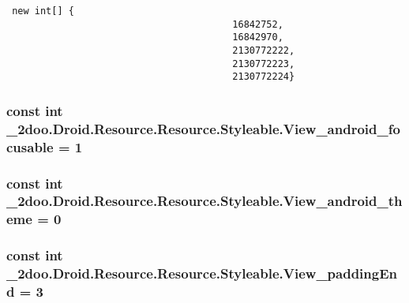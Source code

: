 \begin{Code}\begin{verbatim} new int[] {
                                        16842752,
                                        16842970,
                                        2130772222,
                                        2130772223,
                                        2130772224}
\end{verbatim}
\end{Code}
\hypertarget{class__2doo_1_1_droid_1_1_resource_1_1_styleable_40908f341b49b3e6357f0740e596a346}{
\subsubsection[{View\_\-android\_\-focusable}]{\setlength{\rightskip}{0pt plus 5cm}const int \_\-2doo.Droid.Resource.Resource.Styleable.View\_\-android\_\-focusable = 1}}
\label{class__2doo_1_1_droid_1_1_resource_1_1_styleable_40908f341b49b3e6357f0740e596a346}


\hypertarget{class__2doo_1_1_droid_1_1_resource_1_1_styleable_582f6e13b5f6e9b24198bc2162a15354}{
\subsubsection[{View\_\-android\_\-theme}]{\setlength{\rightskip}{0pt plus 5cm}const int \_\-2doo.Droid.Resource.Resource.Styleable.View\_\-android\_\-theme = 0}}
\label{class__2doo_1_1_droid_1_1_resource_1_1_styleable_582f6e13b5f6e9b24198bc2162a15354}


\hypertarget{class__2doo_1_1_droid_1_1_resource_1_1_styleable_4c21e56772b8da0e6bde3b85be68e95f}{
\subsubsection[{View\_\-paddingEnd}]{\setlength{\rightskip}{0pt plus 5cm}const int \_\-2doo.Droid.Resource.Resource.Styleable.View\_\-paddingEnd = 3}}
\label{class__2doo_1_1_droid_1_1_resource_1_1_styleable_4c21e56772b8da0e6bde3b85be68e95f}


